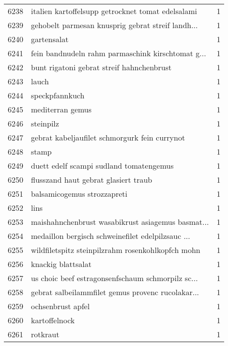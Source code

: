 \begin{tabular}{llr}
6238 &  italien kartoffelsupp getrocknet tomat edelsalami &      1 \\
6239 &  gehobelt parmesan knusprig gebrat streif landh... &      1 \\
6240 &                                        gartensalat &      1 \\
6241 &  fein bandnudeln rahm parmaschink kirschtomat g... &      1 \\
6242 &          bunt rigatoni gebrat streif hahnchenbrust &      1 \\
6243 &                                              lauch &      1 \\
6244 &                                     speckpfannkuch &      1 \\
6245 &                                   mediterran gemus &      1 \\
6246 &                                          steinpilz &      1 \\
6247 &      gebrat kabeljaufilet schmorgurk fein currynot &      1 \\
6248 &                                              stamp &      1 \\
6249 &            duett edelf scampi sudland tomatengemus &      1 \\
6250 &               flusszand haut gebrat glasiert traub &      1 \\
6251 &                        balsamicogemus strozzapreti &      1 \\
6252 &                                               lins &      1 \\
6253 &  maishahnchenbrust wasabikrust asiagemus basmat... &      1 \\
6254 &  medaillon bergisch schweinefilet edelpilzsauc ... &      1 \\
6255 &  wildfiletspitz steinpilzrahm rosenkohlkopfch mohn &      1 \\
6256 &                                 knackig blattsalat &      1 \\
6257 &  us choic beef estragonsenfschaum schmorpilz sc... &      1 \\
6258 &  gebrat salbeilammfilet gemus provenc rucolakar... &      1 \\
6259 &                                  ochsenbrust apfel &      1 \\
6260 &                                      kartoffelnock &      1 \\
6261 &                                           rotkraut &      1 \\

\end{tabular}
